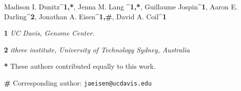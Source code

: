 Madison I. Dunitz^{\textbf{1,*}}, Jenna M. Lang ^{\textbf{1,*}}, Guillaume Jospin^{\textbf{1}}, Aaron E. Darling^{\textbf{2}}, Jonathan A. Eisen^{\textbf{1,#}}, David A. Coil^{\textbf{1}} 

\textbf{1} \textit{UC Davis, Genome Center.}

\textbf{2} \textit{ithree institute, University of Technology Sydney, Australia}

\textbf{*} These authors contributed equally to this work.

\textbf{#} Corresponding author: \verb|jaeisen@ucdavis.edu|